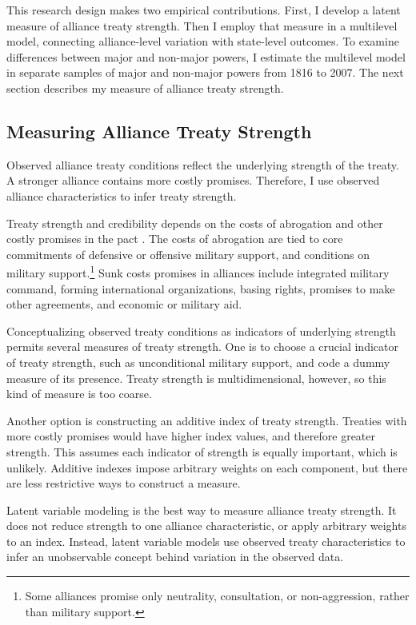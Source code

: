 \documentclass[12pt]{article}
\begin{document}
This research design makes two empirical contributions. 
First, I develop a latent measure of alliance treaty strength. 
Then I employ that measure in a multilevel model, connecting alliance-level variation with state-level outcomes. 
To examine differences between major and non-major powers, I estimate the multilevel model in separate samples of major and non-major powers from 1816 to 2007. 
The next section describes my measure of alliance treaty strength. 


\subsection{Measuring Alliance Treaty Strength} 

Observed alliance treaty conditions reflect the underlying strength of the treaty. 
A stronger alliance contains more costly promises. 
Therefore, I use observed alliance characteristics to infer treaty strength.


Treaty strength and credibility depends on the costs of abrogation and other costly promises in the pact \citep{Leeds2003}. 
The costs of abrogation are tied to core commitments of defensive or offensive military support, and conditions on military support.\footnote{Some alliances promise only neutrality, consultation, or non-aggression, rather than military support.}  
Sunk costs promises in alliances include integrated military command, forming international organizations, basing rights, promises to make other agreements, and economic or military aid. 


Conceptualizing observed treaty conditions as indicators of underlying strength permits several measures of treaty strength. 
One is to choose a crucial indicator of treaty strength, such as unconditional military support, and code a dummy measure of its presence. 
Treaty strength is multidimensional, however, so this kind of measure is too coarse. 


Another option is constructing an additive index of treaty strength. 
Treaties with more costly promises would have higher index values, and therefore greater strength. 
This assumes each indicator of strength is equally important, which is unlikely. 
Additive indexes impose arbitrary weights on each component, but there are less restrictive ways to construct a measure. 


Latent variable modeling is the best way to measure alliance treaty strength. 
It does not reduce strength to one alliance characteristic, or apply arbitrary weights to an index. 
Instead, latent variable models use observed treaty characteristics to infer an unobservable concept behind variation in the observed data. 
\end{document}
